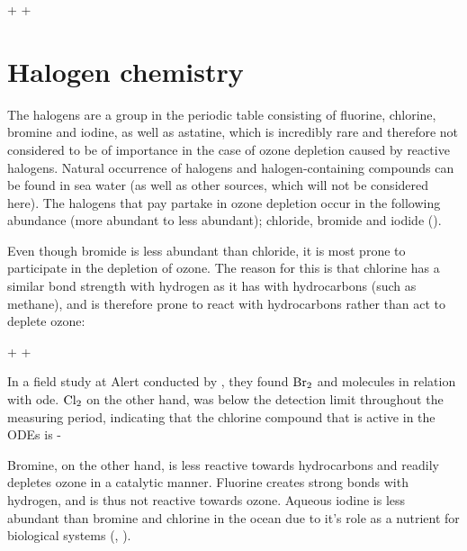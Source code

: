 \begin{reaction}
     +  \rightarrow {} + 
    \label{rqn:o3no}
\end{reaction}




\section{Halogen chemistry}


The halogens are a group in the periodic table consisting of fluorine, chlorine, bromine and iodine, as well as astatine, which is incredibly rare and therefore not considered to be of importance in the case of ozone depletion caused by reactive halogens. Natural occurrence of halogens and halogen-containing compounds can be found in sea water (as well as other sources, which will not be considered here). The halogens that pay partake in ozone depletion occur in the following abundance (more abundant to less abundant); chloride, bromide and iodide (\cite{Simpson2015}). 

\medskip

Even though bromide is less abundant than chloride, it is most prone to participate in the depletion of ozone. The reason for this is that chlorine has a similar bond strength with hydrogen as it has with hydrocarbons (such as methane), and is therefore prone to react with hydrocarbons rather than act to deplete ozone: 

\begin{reaction}
     +  \rightarrow {} + 
    \label{R:cl_ch4}
\end{reaction}

In a field study at Alert conducted by \cite{Foster2001}, they found $\mathrm{Br_2}$ and  molecules in relation with \acrshort{ode}. $\mathrm{Cl_2}$ on the other hand, was below the detection limit throughout the measuring period, indicating that the chlorine compound that is active in the ODEs is - 

\medskip

Bromine, on the other hand, is less reactive towards hydrocarbons and readily depletes ozone in a catalytic manner.  Fluorine creates strong bonds with hydrogen, and is thus not reactive towards ozone. Aqueous iodine is less abundant than bromine and chlorine in the ocean due to it's role as a nutrient for biological systems (\cite{FinlaysonPitts2010}, \cite{Simpson2015}). 

